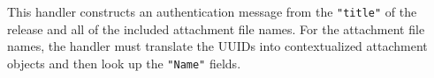 This handler constructs an authentication message from the \lstinline{"title"} of the release and all of the included attachment file names. For the attachment file names, the handler must translate the UUIDs into contextualized attachment objects and then look up the \lstinline{"Name"} fields.


